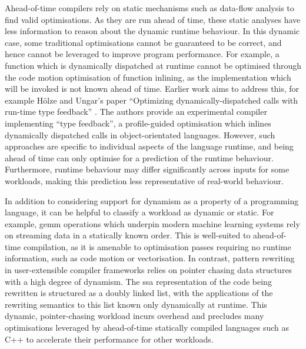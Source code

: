 Ahead-of-time compilers rely on static mechanisms such as data-flow analysis to find valid optimisations.
As they are run ahead of time, these static analyses have less information to reason about the dynamic runtime behaviour. In this dynamic case, some traditional optimisations cannot be guaranteed to be correct, and hence cannot be leveraged to improve program performance. For example, a function which is dynamically dispatched at runtime cannot be optimised through the code motion optimisation of function inlining, as the implementation which will be invoked is not known ahead of time.
Earlier work aims to address this, for example H\"olze and Ungar's paper ``Optimizing dynamically-dispatched calls with run-time type feedback'' \cite{holzleOptimizingDynamicallydispatchedCalls1994}. The authors provide an experimental compiler implementing ``type feedback'', a profile-guided optimisation which inlines dynamically dispatched calls in object-orientated languages.
However, such approaches are specific to individual aspects of the language runtime, and being ahead of time can only optimise for a prediction of the runtime behaviour.
Furthermore, runtime behaviour may differ significantly across inputs for some workloads, making this prediction less representative of real-world behaviour.

In addition to considering support for dynamism as a property of a programming language, it can be helpful to classify a workload as dynamic or static.
For example, \ac{gemm} operations which underpin modern machine learning systems rely on streaming data in a statically known order. This is well-suited to ahead-of-time compilation, as it is amenable to optimisation passes requiring no runtime information, such as code motion or vectorisation.
In contrast, pattern rewriting in user-extensible compiler frameworks relies on pointer chasing data structures with a high degree of dynamism. The \ac{ssa} representation of the code being rewritten is structured as a doubly linked list, with the applications of the rewriting semantics to this list known only dynamically at runtime.
This dynamic, pointer-chasing workload incurs overhead and precludes many optimisations leveraged by ahead-of-time statically compiled languages such as C++ to accelerate their performance for other workloads.




